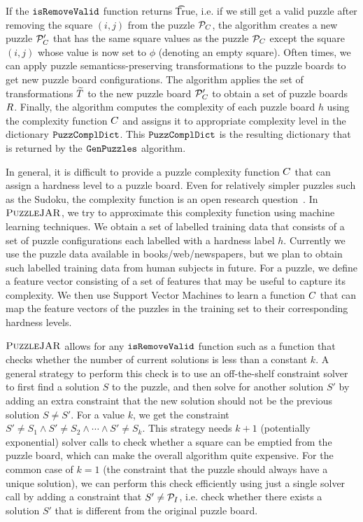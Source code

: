 If the $\texttt{isRemoveValid}$ function returns \t{True}, i.e. if we still
get a valid puzzle after removing the square $(i,j)$ from the puzzle
$\mathcal{P}_C$, the algorithm creates a new puzzle $\mathcal{P}_C'$
that has the same square values as the puzzle $\mathcal{P}_C$ except
the square $(i,j)$ whose value is now set to $\phi$ (denoting an empty
square). Often times, we can apply puzzle semanticss-preserving
transformations to the puzzle boards to get new puzzle board
configurations. The algorithm applies the set of transformations
$\widetilde{T}$ to the new puzzle board $\mathcal{P}_C'$ to
obtain a set of puzzle boards $R$. Finally, the algorithm
computes the complexity of each puzzle board $h$ using the complexity
function $C$ and assigns it to appropriate complexity
level in the dictionary $\texttt{PuzzComplDict}$. This $\texttt{PuzzComplDict}$ is
the resulting dictionary that is returned by the $\texttt{GenPuzzles}$
algorithm.

In general, it is difficult to provide a puzzle complexity function
$C$ that can assign a hardness level to a puzzle
board. Even for relatively simpler puzzles such as the Sudoku, the
complexity function is an open research
question~\cite{sudokuchaos}. In $\textsc{PuzzleJAR}$, we try to approximate
this complexity function using machine learning techniques. We obtain
a set of labelled training data that consists of a set of puzzle
configurations each labelled with a hardness label $h$. Currently we
use the puzzle data available in books/web/newspapers, but we plan to
obtain such labelled training data from human subjects in future. For
a puzzle, we define a feature vector consisting of a set of features
that may be useful to capture its complexity. We then use Support
Vector Machines to learn a function $C$ that can map
the feature vectors of the puzzles in the training set to their
corresponding hardness levels.

$\textsc{PuzzleJAR}$ allows for any $\texttt{isRemoveValid}$ function such as a
function that checks whether the number of current solutions is less
than a constant $k$. A general strategy to perform this check is to
use an off-the-shelf constraint solver to first find a solution $S$ to
the puzzle, and then solve for another solution $S'$ by adding an
extra constraint that the new solution should not be the previous
solution $S \neq S'$. For a value $k$, we get the constraint $S' \neq
S_1 \land S' \neq S_2 \land \cdots \land S' \neq S_k$. This strategy
needs $k+1$ (potentially exponential) solver calls to check whether a
square can be emptied from the puzzle board, which can make the
overall algorithm quite expensive. For the common case of $k=1$ (the
constraint that the puzzle should always have a unique solution), we
can perform this check efficiently using just a single solver call by
adding a constraint that $S' \neq \mathcal{P}_I$, i.e. check whether
there exists a solution $S'$ that is different from the original
puzzle board.

